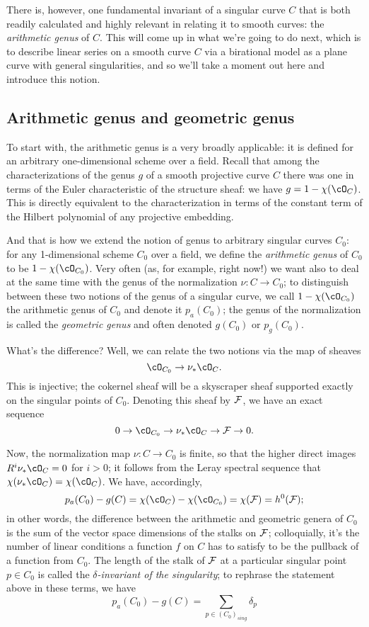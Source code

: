 There is, however, one fundamental invariant of a singular curve $C$ that is both readily calculated and highly relevant in relating it to smooth curves: the \emph{arithmetic genus} of $C$. This will come up in what we're going to do next, which is to describe linear series on a smooth curve $C$ via a birational model as a plane curve with general singularities, and so we'll take a moment out here and introduce this notion.

\subsection{Arithmetic genus and geometric genus}

To start with, the arithmetic genus is a very broadly applicable: it is defined for an arbitrary one-dimensional scheme over a field. Recall that among the characterizations of the genus $g$ of a smooth projective curve $C$ there was one in terms of the Euler characteristic of the structure sheaf: we have $g = 1 - \chi(\cO_C)$. This is directly equivalent to the characterization in terms of the constant term of the Hilbert polynomial of any projective embedding.

And that is how we extend the notion of genus to arbitrary singular curves $C_0$: for any 1-dimensional scheme $C_0$ over a field, we define the \emph{arithmetic genus} of $C_0$ to be $1-\chi(\cO_{C_0})$. Very often (as, for example, right now!) we want also to deal at the same time with the genus of the normalization $\nu : C \to C_0$; to distinguish between these two notions of the genus of a singular curve, we call $1-\chi(\cO_{C_0})$ the arithmetic genus of $C_0$ and denote it $p_a(C_0)$; the genus of the normalization is called the \emph{geometric genus} and often denoted $g(C_0)$ or $p_g(C_0)$.

What's the difference? Well, we can relate the two notions via the map of sheaves
$$
\cO_{C_0} \to \nu_*\cO_C.
$$
This is injective; the cokernel sheaf will be a skyscraper sheaf supported exactly on the singular points of $C_0$. Denoting this sheaf by $\cF$, we have an exact sequence
$$
0 \to \cO_{C_0} \to \nu_*\cO_C \to \cF \to 0.
$$

Now, the normalization map $\nu: C \to C_0$ is finite, so that the higher direct images $R^i\nu_*\cO_C = 0$ for $i > 0$; it follows from the Leray spectral sequence that $\chi(\nu_*\cO_C) = \chi(\cO_C)$. We have, accordingly,
$$
p_a(C_0) - g(C) =  \chi(\cO_{C}) -   \chi(\cO_{C_0}) = \chi(\cF) = h^0(\cF);
$$ 
in other words, the difference between the arithmetic and geometric genera of $C_0$ is the sum of the vector space dimensions of the stalks on $\cF$; colloquially, it's the number of linear conditions a function $f$ on $C$ has to satisfy to be the pullback of a function from $C_0$. The length of the stalk of $\cF$ at a particular singular point $p \in C_0$ is called the \emph{$\delta$-invariant of the singularity}; to rephrase the statement above in these terms, we have
$$
p_a(C_0) - g(C) = \sum_{p \in (C_0)_{sing}} \delta_p
$$ 

